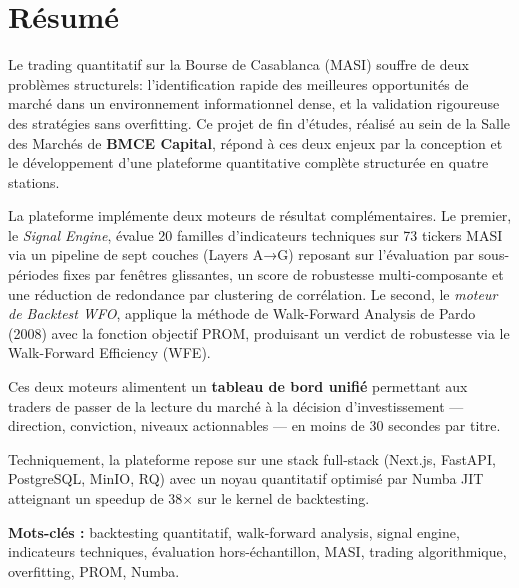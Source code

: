 \chapter*{Résumé}
\thispagestyle{plain}

Le trading quantitatif sur la Bourse de Casablanca (MASI) souffre de deux problèmes
structurels: l'identification rapide des meilleures opportunités de marché dans un
environnement informationnel dense, et la validation rigoureuse des stratégies sans
overfitting. Ce projet de fin d'études, réalisé au sein de la Salle des Marchés de
\textbf{BMCE Capital}, répond à ces deux enjeux par la conception et le développement
d'une plateforme quantitative complète structurée en quatre stations.

\medskip

La plateforme implémente deux moteurs de résultat complémentaires. Le premier, le
\textit{Signal Engine}, évalue 20 familles d'indicateurs techniques sur 73 tickers MASI
via un pipeline de sept couches (Layers A→G) reposant sur l'évaluation par sous-périodes fixes
par fenêtres glissantes, un score de robustesse multi-composante et une réduction
de redondance par clustering de corrélation. Le second, le \textit{moteur de Backtest
WFO}, applique la méthode de Walk-Forward Analysis de Pardo (2008) avec la fonction
objectif PROM, produisant un verdict de robustesse via le Walk-Forward Efficiency (WFE).

\medskip

Ces deux moteurs alimentent un \textbf{tableau de bord unifié} permettant aux traders
de passer de la lecture du marché à la décision d'investissement — direction, conviction,
niveaux actionnables — en moins de 30 secondes par titre.

\medskip

Techniquement, la plateforme repose sur une stack full-stack (Next.js, FastAPI, PostgreSQL,
MinIO, RQ) avec un noyau quantitatif optimisé par Numba JIT atteignant un speedup de 38×
sur le kernel de backtesting.

\bigskip
\noindent\textbf{Mots-clés :}
backtesting quantitatif, walk-forward analysis, signal engine, indicateurs techniques,
évaluation hors-échantillon, MASI, trading algorithmique, overfitting, PROM, Numba.
